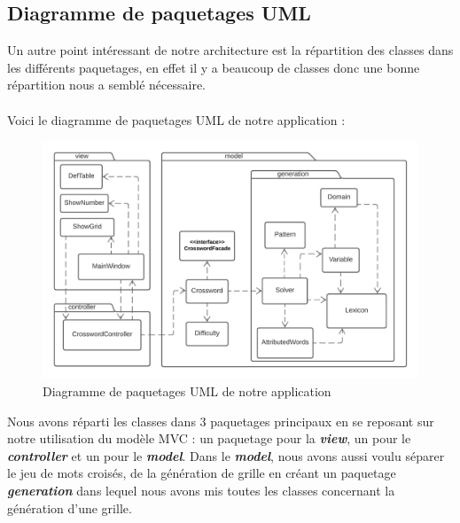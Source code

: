\documentclass [ 11 pt ] {article}
\begin{document}
\subsection{Diagramme de paquetages UML}
    Un autre point intéressant de notre architecture est la répartition des classes dans les différents paquetages, en effet il y a beaucoup de classes donc une bonne répartition nous a semblé nécessaire.
    \\\\
    Voici le diagramme de paquetages UML de notre application : 
    \begin{figure}[H] 
    \center 
    \includegraphics[width=1\linewidth]{diag_paquetages.jpeg}
    \caption{Diagramme de paquetages UML de notre application}
    \end{figure}
    Nous avons réparti les classes dans 3 paquetages principaux en se reposant sur notre utilisation du modèle MVC : un paquetage pour la \textbf{\textit{view}}, un pour le \textbf{\textit{controller}} et un pour le \textbf{\textit{model}}. Dans le \textbf{\textit{model}}, nous avons aussi voulu séparer le jeu de mots croisés, de la génération de grille en créant un paquetage \textbf{\textit{generation}} dans lequel nous avons mis toutes les classes concernant la génération d’une grille.
    
\end{document}
